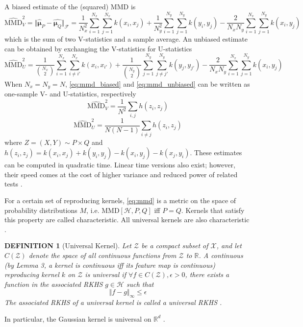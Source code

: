 \documentclass[a4paper,12pt]{article}
\newtheorem{definition}[theorem]{DEFINITION}
\begin{document}
A biased estimate of the (squared) MMD is
\begin{equation}
        \widehat{\mathrm{MMD}}_{V}^{2} = \Vert \hat{\mathbf{\mu}}_{P}-\hat{\mathbf{\mu}_{Q}} \Vert_{\mathcal{F}} = \frac{1}{N_{x}^{2}} \sum_{i=1}^{N_{x}} \sum_{j=1}^{N_{x}} k\left(x_{i}, x_{j}\right)+\frac{1}{N_{y}^{2}} \sum_{i=1}^{N_{y}} \sum_{j=1}^{N_{y}} k\left(y_{i}, y_{j}\right)
        -\frac{2}{N_{x} N_{y}} \sum_{i=1}^{N_{x}} \sum_{j=1}^{N_{y}} k\left(x_{i}, y_{j}\right)
        \label{eq:mmd_biased}
\end{equation}
which is the sum of two V-statistics and a sample average. An unbiased estimate can be obtained by exchanging the V-statistics for U-statistics
\begin{equation}
    \widehat{\mathrm{MMD}}_{U}^{2} = \frac{1}{{N_{x}\choose 2}} \sum_{i = 1}^{N_{x}} \sum_{i \neq i'}^{N_{x}} k\left(x_{i}, x_{i'}\right)+\frac{1}{{N_{y}\choose 2}} \sum_{j = 1}^{N_{y}} \sum_{j \neq j'}^{N_{y}} k\left(y_{j}, y_{j'}\right)-\frac{2}{N_{x}N_{y}} \sum_{i = 1}^{N_{x}} \sum_{j = 1}^{N_{y}} k\left(x_{i}, y_{j}\right)
    \label{eq:mmd_unbiased}
\end{equation}
When $N_{x}=N_{y}=N$, \eqref{eq:mmd_biased} and \eqref{eq:mmd_unbiased} can be written as one-sample V- and U-statistics, respectively
\begin{equation}
    \widehat{\mathrm{MMD}}_{V}^{2} = \frac{1}{N^{2}} \sum_{i, j} h(z_{i}, z_{j})
    \label{eq:mmd_biased_v}
\end{equation}
\begin{equation}
    \widehat{\mathrm{MMD}}_{U}^{2} = \frac{1}{N(N-1)} \sum_{i \neq j} h(z_{i}, z_{j})
    \label{eq:mmd_unbiased_u}
\end{equation}
where $Z = (X, Y) \sim P \times Q$ and $h(z_{i}, z_{j})=k(x_{i}, x_{j}) + k(y_{i}, y_{j}) - k(x_{i}, y_{j}) - k(x_{j}, y_{i})$. These estimates can be computed in quadratic time. Linear time versions also exist; however, their speed comes at the cost of higher variance and reduced power of related tests \cite{gretton_kernel_2012}.

For a certain set of reproducing kernels, \eqref{eq:mmd} is a metric on the space of probability distributions $M$, i.e. $\mathrm{MMD}[\mathcal{H}, P, Q]$ iff $P=Q$. Kernels that satisfy this property are called characteristic. All universal kernels are also characteristic \cite{sriperumbudur_hilbert_2010}.

\begin{definition}[Universal Kernel]
Let $\mathcal{Z}$ be a compact subset of $\mathcal{X}$, and let $C(\mathcal{Z})$ denote the space of all continuous functions from $\mathcal{Z}$ to $\mathbb{R}$. A continuous (by \cite{steinwart_uence_2001} Lemma 3, a kernel is continuous iff its feature map is continuous) reproducing kernel $k$ on $\mathcal{Z}$ is universal if $\forall f \in C(\mathcal{Z}), \epsilon>0$, there exists a function in the associated RKHS $g \in \mathcal{H}$ such that 
$$ \Vert f-g \Vert_{\infty} \leq \epsilon $$
The associated RKHS of a universal kernel is called a universal RKHS \cite{steinwart_uence_2001}.
\end{definition}
In particular, the Gaussian kernel is universal on $\mathbb{R}^{d}$ \cite{steinwart_uence_2001}.
\end{document}
